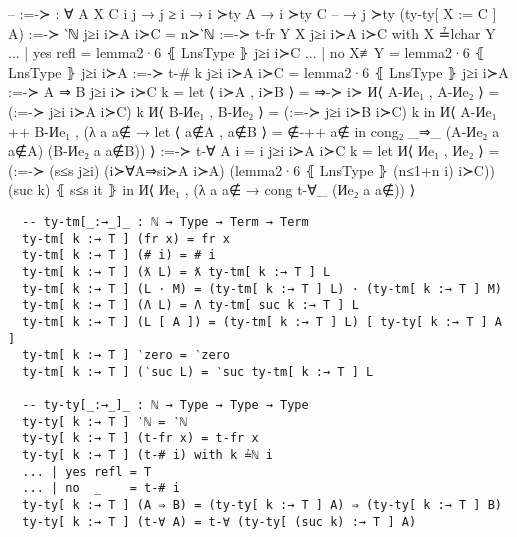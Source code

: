 \documentclass[logo,bsc,singlespacing,parskip,online]{infthesis}
\renewenvironment{code}{\mintedcopy[breaklines,breaksymbolleft=\;]{agda}}{\endmintedcopy}
\begin{document}
\begin{code}
  -- :=-≻ : ∀ {A X C i j} → j ≥ i → i ≻ty A → i ≻ty C
  --   → j ≻ty (ty-ty[ X := C ] A)
  :=-≻ {‵ℕ} j≥i i≻A i≻C = n≻‵ℕ
  :=-≻ {t-fr Y} {X} j≥i i≻A i≻C with X ≟lchar Y
  ... | yes refl = lemma2·6 ⦃ LnsType ⦄ j≥i i≻C
  ... | no  X≢Y  = lemma2·6 ⦃ LnsType ⦄ j≥i i≻A
  :=-≻ {t-# k} j≥i i≻A i≻C = lemma2·6 ⦃ LnsType ⦄ j≥i i≻A
  :=-≻ {A ⇒ B} j≥i i≻ i≻C k =
    let ⟨ i≻A , i≻B ⟩ = ⇒-≻ i≻
        И⟨ A-Иe₁ , A-Иe₂ ⟩ = (:=-≻ j≥i i≻A i≻C) k
        И⟨ B-Иe₁ , B-Иe₂ ⟩ = (:=-≻ j≥i i≻B i≻C) k
    in И⟨ A-Иe₁ ++ B-Иe₁ , (λ a {a∉} →
      let ⟨ a∉A , a∉B ⟩ = ∉-++ a∉
      in cong₂ _⇒_ (A-Иe₂ a {a∉A}) (B-Иe₂ a {a∉B})) ⟩
  :=-≻ {t-∀ A} {i = i}  j≥i i≻A i≻C k =
    let И⟨ Иe₁ , Иe₂ ⟩ = (:=-≻ (s≤s j≥i) (i≻∀A⇒si≻A i≻A) (lemma2·6 ⦃ LnsType ⦄ (n≤1+n i) i≻C)) (suc k) ⦃ s≤s it ⦄
    in И⟨ Иe₁ , (λ a {a∉} → cong t-∀_ (Иe₂ a {a∉})) ⟩
\end{code}

\begin{verbatim}
  -- ty-tm[_:→_]_ : ℕ → Type → Term → Term
  ty-tm[ k :→ T ] (fr x) = fr x
  ty-tm[ k :→ T ] (# i) = # i
  ty-tm[ k :→ T ] (ƛ L) = ƛ ty-tm[ k :→ T ] L
  ty-tm[ k :→ T ] (L · M) = (ty-tm[ k :→ T ] L) · (ty-tm[ k :→ T ] M)
  ty-tm[ k :→ T ] (Λ L) = Λ ty-tm[ suc k :→ T ] L
  ty-tm[ k :→ T ] (L [ A ]) = (ty-tm[ k :→ T ] L) [ ty-ty[ k :→ T ] A ]
  ty-tm[ k :→ T ] ‵zero = ‵zero
  ty-tm[ k :→ T ] (‵suc L) = ‵suc ty-tm[ k :→ T ] L

  -- ty-ty[_:→_]_ : ℕ → Type → Type → Type
  ty-ty[ k :→ T ] ‵ℕ = ‵ℕ
  ty-ty[ k :→ T ] (t-fr x) = t-fr x
  ty-ty[ k :→ T ] (t-# i) with k ≟ℕ i
  ... | yes refl = T
  ... | no  _    = t-# i
  ty-ty[ k :→ T ] (A ⇒ B) = (ty-ty[ k :→ T ] A) ⇒ (ty-ty[ k :→ T ] B)
  ty-ty[ k :→ T ] (t-∀ A) = t-∀ (ty-ty[ (suc k) :→ T ] A)
\end{verbatim}
\end{document}
